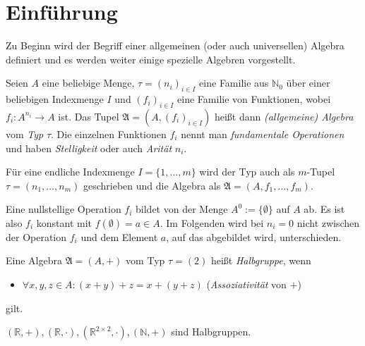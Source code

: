 \section{Einführung}

Zu Beginn wird der Begriff einer allgemeinen (oder auch universellen) Algebra definiert und es werden weiter einige spezielle Algebren vorgestellt.

\begin{definition}\label{def:algebra}\label{def:allg_algebra}
    Seien $A$ eine beliebige Menge, $\tau = (n_i)_{i \in I}$ eine Familie aus $\mathbb{N}_0$ über einer beliebigen Indexmenge $I$ und $(f_i)_{i \in I}$ eine Familie von Funktionen, wobei $f_i: A^{n_i} \to A$ ist. 
    Das Tupel $\mathfrak{A} = (A, (f_i)_{i \in I})$ heißt dann \emph{(allgemeine) Algebra} vom \emph{Typ} $\tau$. Die einzelnen Funktionen $f_i$ nennt man \emph{fundamentale Operationen} und haben \emph{Stelligkeit} oder auch \emph{Arität} $n_i$.
\end{definition}

\begin{remark}
    Für eine endliche Indexmenge $I = \{1, \ldots, m\}$ wird der Typ auch als $m$-Tupel $\tau = (n_1, \ldots, n_m)$ geschrieben und die Algebra als $\mathfrak{A} = (A, f_1, \ldots, f_m)$.
\end{remark}

\begin{remark}
    Eine nullstellige Operation $f_i$ bildet von der Menge $A^0 := \{\emptyset\}$ auf $A$ ab. Es ist also $f_i$ konstant mit $f(\emptyset) = a \in A$. Im Folgenden wird bei $n_i = 0$ nicht zwischen der Operation $f_i$ und dem Element $a$, auf das abgebildet wird, unterschieden.
\end{remark}

\begin{definition}\label{def:halbgruppe}
    Eine Algebra $\mathfrak{A} = (A, +)$ vom Typ $\tau = (2)$ heißt \emph{Halbgruppe}, wenn 
    \begin{itemize}
        \item $\forall x,y,z \in A: (x + y) + z = x + (y + z)$ \tab (\emph{Assoziativität} von $+$)
    \end{itemize}
    gilt.
\end{definition}

\begin{example} $(\mathbb{R}, +), (\mathbb{R}, \cdot), (\mathbb{R}^{2\times 2}, \cdot), (\mathbb{N}, +)$ sind Halbgruppen.
\end{example}

